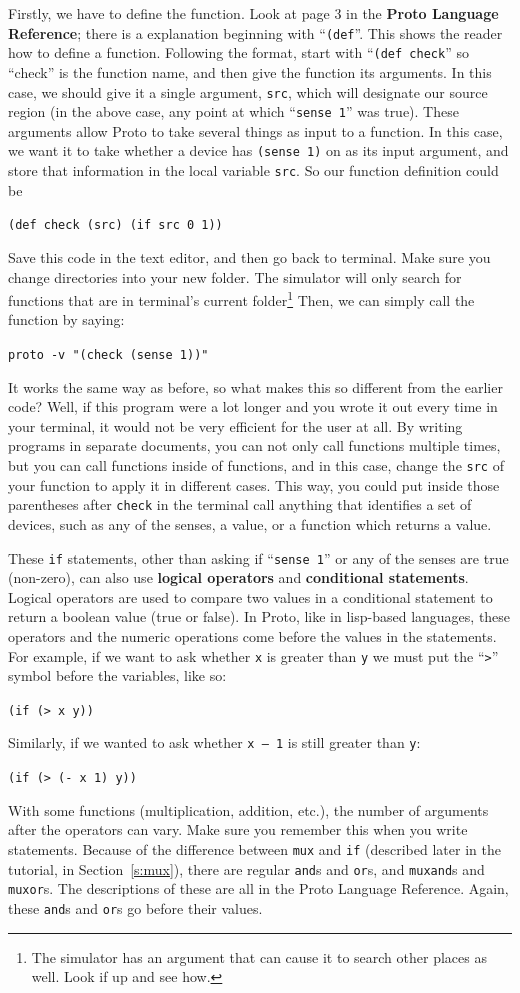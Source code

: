 \documentclass{article}
\newcommand\code[1]{\begin{center}\var{#1}\end{center}}
\newcommand\var[1]{{\tt #1}}
\newcommand\qvar[1]{``{\tt #1}''}
\begin{document}
Firstly, we have to define the function.  Look at page 3 in the {\bf
  Proto Language Reference}; there is a explanation beginning with
\qvar{(def}.  This shows the reader how to define a function.
Following the format, start with \qvar{(def check} so ``check'' is the
function name, and then give the function its arguments.  In this
case, we should give it a single argument, \var{src}, which will
designate our source region (in the above case, any point at which
\qvar{sense 1} was true).  These arguments allow Proto to take several
things as input to a function.  In this case, we want it to take
whether a device has \var{(sense 1)} on as its input argument, and store
that information in the local variable \var{src}. So our function definition
could be \code{(def check (src) (if src 0 1))}

Save this code in the text editor, and then go back to terminal.  Make
sure you change directories into your new folder.  The simulator will
only search for functions that are in terminal's current
folder\footnote{The simulator has an argument that can cause it to
  search other places as well.  Look if up and see how.}  Then, we can
simply call the function by saying:

\code{proto -v "(check (sense 1))"}

It works the same way as before, so what makes this so different from
the earlier code?  Well, if this program were a lot longer and you
wrote it out every time in your terminal, it would not be very
efficient for the user at all.  By writing programs in separate
documents, you can not only call functions multiple times, but you can
call functions inside of functions, and in this case, change the
\var{src} of your function to apply it in different cases.  This way,
you could put inside those parentheses after \var{check} in the
terminal call anything that identifies a set of devices, such as any
of the senses, a value, or a function which returns a value.

These \var{if} statements, other than asking if \qvar{sense 1} or any
of the senses are true (non-zero), can also use {\bf logical
  operators} and {\bf conditional statements}.  Logical operators are
used to compare two values in a conditional statement to return a
boolean value (true or false).  In Proto, like in lisp-based
languages, these operators and the numeric operations come before the
values in the statements.  For example, if we want to ask whether
\var{x} is greater than \var{y} we must put the \qvar{>} symbol
before the variables, like so: \code{(if (> x y))}  Similarly, if we
wanted to ask whether \var{x – 1} is still greater than \var{y}:
\code{(if (> (- x 1) y))} With some functions (multiplication,
addition, etc.), the number of arguments after the operators can vary.
Make sure you remember this when you write statements.  Because of the
difference between \var{mux} and \var{if} (described later in the
tutorial, in Section~\ref{s:mux}), there are regular \var{and}s and
\var{or}s, and \var{muxand}s and \var{muxor}s.  The descriptions of
these are all in the Proto Language Reference.  Again, these
\var{and}s and \var{or}s go before their values.
\end{document}
